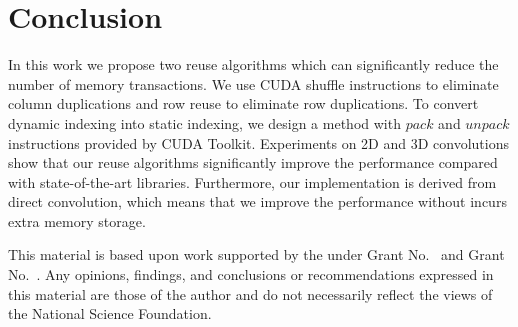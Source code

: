 \section{Conclusion}
In this work we propose two reuse algorithms which can significantly reduce the number of memory transactions. We use CUDA shuffle
instructions to eliminate column duplications and row reuse to eliminate row duplications. To convert dynamic indexing into static
indexing, we design a method with $pack$ and $unpack$ instructions provided by CUDA Toolkit. Experiments on 2D and 3D convolutions show
that our reuse algorithms significantly improve the performance compared with state-of-the-art libraries. Furthermore, our implementation
is derived from direct convolution, which means that we improve the performance without incurs extra memory storage.
\begin{acks}                            %
  This material is based upon work supported by the
   under Grant
  No.~ and Grant
  No.~.  Any opinions, findings, and
  conclusions or recommendations expressed in this material are those
  of the author and do not necessarily reflect the views of the
  National Science Foundation.
\end{acks}
